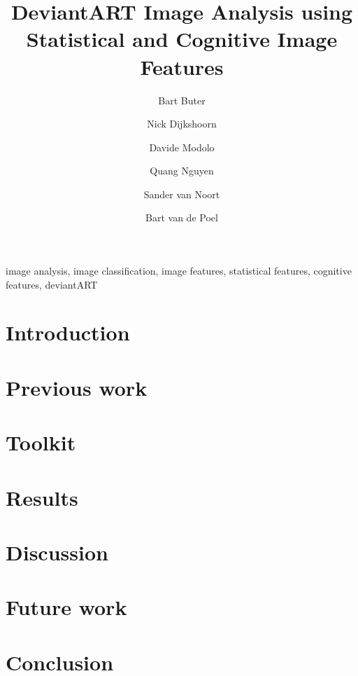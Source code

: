 \documentclass[%
        final,
        notitlepage,
        narroweqnarray,
        inline,
        ]{ieee}
\begin{document}
\title[DeviantART Image Analysis]{%
       DeviantART Image Analysis using Statistical and Cognitive Image Features}
\author{Bart Buter  \and Nick Dijkshoorn \and Davide Modolo  \and Quang Nguyen \and Sander van Noort \and Bart van de Poel}

\maketitle


\begin{abstract}

\end{abstract}


\begin{keywords}
image analysis, image classification, image features, statistical features, cognitive features, deviantART
\end{keywords}


\section{Introduction}



\section{Previous work}



\section{Toolkit}



\section{Results}


\section{Discussion}


\section{Future work}


\section{Conclusion}


\nocite{*}


\end{document}
